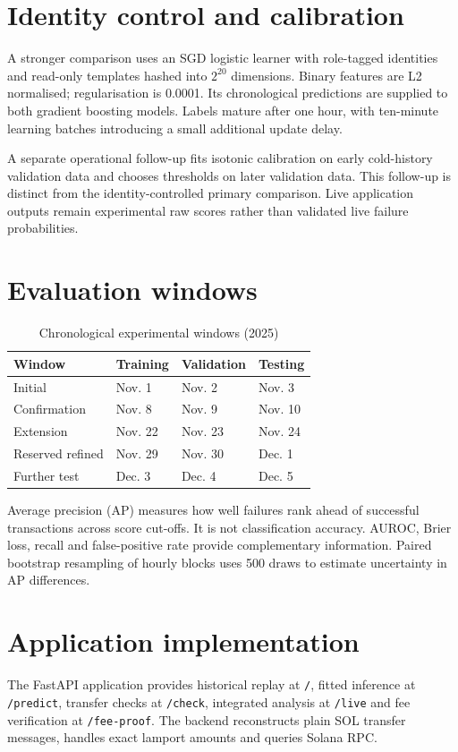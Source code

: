 \documentclass[12pt,a4paper,oneside]{report}
\begin{document}
\section{Identity control and calibration}
A stronger comparison uses an SGD logistic learner with role-tagged identities and read-only templates hashed into $2^{20}$ dimensions. Binary features are L2 normalised; regularisation is 0.0001. Its chronological predictions are supplied to both gradient boosting models. Labels mature after one hour, with ten-minute learning batches introducing a small additional update delay.

A separate operational follow-up fits isotonic calibration on early cold-history validation data and chooses thresholds on later validation data. This follow-up is distinct from the identity-controlled primary comparison. Live application outputs remain experimental raw scores rather than validated live failure probabilities.
\section{Evaluation windows}
\begin{table}[ht]\centering\caption{Chronological experimental windows (2025)}
\begin{tabular}{llll}\toprule Window&Training&Validation&Testing\\\midrule Initial&Nov. 1&Nov. 2&Nov. 3\\Confirmation&Nov. 8&Nov. 9&Nov. 10\\Extension&Nov. 22&Nov. 23&Nov. 24\\Reserved refined&Nov. 29&Nov. 30&Dec. 1\\Further test&Dec. 3&Dec. 4&Dec. 5\\\bottomrule\end{tabular}\end{table}
Average precision (AP) measures how well failures rank ahead of successful transactions across score cut-offs. It is not classification accuracy. AUROC, Brier loss, recall and false-positive rate provide complementary information. Paired bootstrap resampling of hourly blocks uses 500 draws to estimate uncertainty in AP differences.
\section{Application implementation}
The FastAPI application provides historical replay at \texttt{/}, fitted inference at \texttt{/predict}, transfer checks at \texttt{/check}, integrated analysis at \texttt{/live} and fee verification at \texttt{/fee-proof}. The backend reconstructs plain SOL transfer messages, handles exact lamport amounts and queries Solana RPC.
\end{document}
